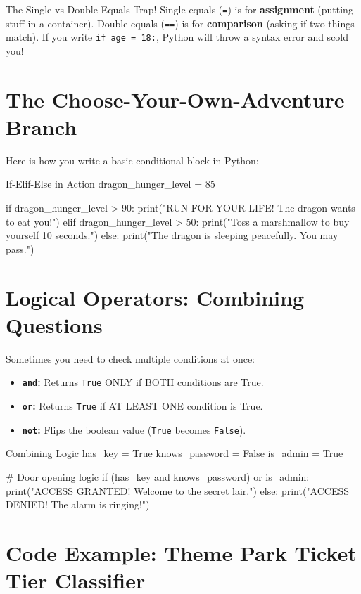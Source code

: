 \begin{viperpitfall}{The Single vs Double Equals Trap!}
Single equals (\texttt{=}) is for \textbf{assignment} (putting stuff in a container).
Double equals (\texttt{==}) is for \textbf{comparison} (asking if two things match).
If you write \texttt{if age = 18:}, Python will throw a syntax error and scold you!
\end{viperpitfall}

\section{The Choose-Your-Own-Adventure Branch}

Here is how you write a basic conditional block in Python:

\begin{pycode}{If-Elif-Else in Action}
dragon_hunger_level = 85

if dragon_hunger_level > 90:
    print("RUN FOR YOUR LIFE! The dragon wants to eat you!")
elif dragon_hunger_level > 50:
    print("Toss a marshmallow to buy yourself 10 seconds.")
else:
    print("The dragon is sleeping peacefully. You may pass.")
\end{pycode}

\section{Logical Operators: Combining Questions}

Sometimes you need to check multiple conditions at once:
\begin{itemize}
    \item \textbf{\texttt{and}:} Returns \texttt{True} ONLY if BOTH conditions are True.
    \item \textbf{\texttt{or}:} Returns \texttt{True} if AT LEAST ONE condition is True.
    \item \textbf{\texttt{not}:} Flips the boolean value (\texttt{True} becomes \texttt{False}).
\end{itemize}

\begin{pycode}{Combining Logic}
has_key = True
knows_password = False
is_admin = True

# Door opening logic
if (has_key and knows_password) or is_admin:
    print("ACCESS GRANTED! Welcome to the secret lair.")
else:
    print("ACCESS DENIED! The alarm is ringing!")
\end{pycode}

\section{Code Example: Theme Park Ticket Tier Classifier}

